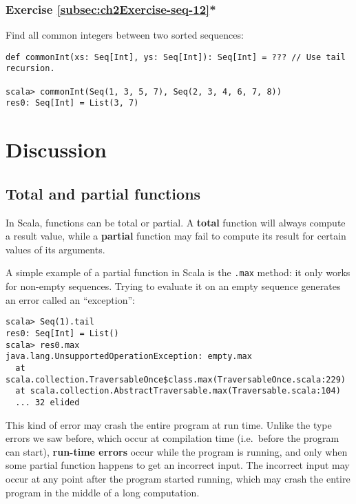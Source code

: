 \subsubsection{Exercise \label{subsec:ch2Exercise-seq-12}\ref{subsec:ch2Exercise-seq-12}{*}}

Find all common integers between two sorted sequences:
\begin{lstlisting}
def commonInt(xs: Seq[Int], ys: Seq[Int]): Seq[Int] = ??? // Use tail recursion.

scala> commonInt(Seq(1, 3, 5, 7), Seq(2, 3, 4, 6, 7, 8))
res0: Seq[Int] = List(3, 7)
\end{lstlisting}

\section{Discussion}

\subsection{Total and partial functions}

In Scala, functions can be total or partial. A \textbf{total}
function will always compute a result value, while a \textbf{partial}
function may fail to compute its result for certain values of its
arguments.

A simple example of a partial function in Scala is the \lstinline!.max!
method: it only works for non-empty sequences. Trying to evaluate
it on an empty sequence generates an error called an ``exception'':
\begin{lstlisting}[mathescape=false]
scala> Seq(1).tail
res0: Seq[Int] = List()
scala> res0.max
java.lang.UnsupportedOperationException: empty.max
  at scala.collection.TraversableOnce$class.max(TraversableOnce.scala:229)
  at scala.collection.AbstractTraversable.max(Traversable.scala:104)
  ... 32 elided 
\end{lstlisting}
This kind of error may crash the entire program at run time. Unlike
the type errors we saw before, which occur at compilation
time (i.e.~before the program can start), \textbf{run-time errors}
occur while the program is running, and only when some partial function
happens to get an incorrect input. The incorrect input may occur at
any point after the program started running, which may crash the entire
program in the middle of a long computation.

